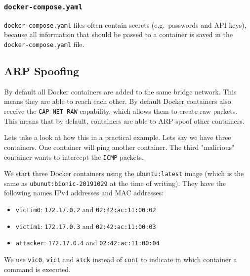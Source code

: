 \subsubsection{\texorpdfstring{\lstinline{docker-compose.yaml}}{docker-compose.yaml}}
\lstinline{docker-compose.yaml} files often contain secrets (e.g.\ passwords and API keys), because all information that should be passed to a container is saved in the \lstinline{docker-compose.yaml} file.

\subsection{ARP Spoofing}
By default all Docker containers are added to the same bridge network. This means they are able to reach each other. By default Docker containers also receive the \lstinline{CAP_NET_RAW} capability, which allows them to create raw packets. This means that by default, containers are able to ARP spoof other containers.

\hfill

Lets take a look at how this in a practical example. Lets say we have three containers. One container will ping another container. The third "malicious" container wants to intercept the \lstinline{ICMP} packets.

We start three Docker containers using the \lstinline{ubuntu:latest} image (which is the same as \lstinline{ubunut:bionic-20191029} at the time of writing). They have the following names IPv4 addresses and MAC addresses:
\begin{itemize}
    \item \lstinline{victim0}: \lstinline{172.17.0.2} and \lstinline{02:42:ac:11:00:02}
    \item \lstinline{victim1}: \lstinline{172.17.0.3} and \lstinline{02:42:ac:11:00:03}
    \item \lstinline{attacker}: \lstinline{172.17.0.4} and \lstinline{02:42:ac:11:00:04}
\end{itemize}

We use \lstinline{vic0}, \lstinline{vic1} and \lstinline{atck} instead of \lstinline{cont} to indicate in which container a command is executed.

